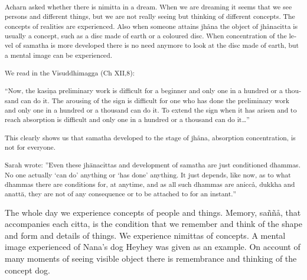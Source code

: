 \textsuperscript{\textdutch{Acharn asked whether there is nimitta in a
dream. When we are dreaming it seems that we see persons and different
things, but we are not really seeing but thinking of different concepts.
The concepts of realities are experienced. Also when someone attains
jhåna the object of jhånacitta is usually a concept, such as a disc made
of earth or a coloured disc. When concentration of the level of samatha
is more developed there is no need anymore to look at the disc made of
earth, but a mental image can be experienced. }}

\textsuperscript{\textdutch{We read in the Visuddhimagga (Ch XII,8):}}

\textsuperscript{``\textenglish[variant=american]{Now, the
kasi}{{ṇ}}\textenglish[variant=american]{a preliminary work is difficult
for a beginner and only one in a hundred or a thousand can do it. The
arousing of the sign is difficult for one who has done the preliminary
work and only one in a hundred or a thousand can do it. To extend the
sign when it has arisen and to reach absorption is difficult and only
one in a hundred or a thousand can do it}\textdutch{\ldots{}''}}

\textsuperscript{\textdutch{This clearly shows us that samatha developed
to the stage of jhåna, absorption concentration, is not for everyone. }}

\textsuperscript{\textdutch{Sarah wrote:
''E}\textenglish[variant=american]{ven these
jh}{{ā}}\textenglish[variant=american]{nacittas and development of
samatha are just conditioned dhammas. No one actually
}\textdutch{`}\textenglish[variant=american]{can
do}\textdutch{'}\textenglish[variant=american]{ anything or
}\textdutch{`}\textenglish[variant=american]{has
done}\textdutch{'}\textenglish[variant=american]{ anything. It just
depends, like now, as to what dhammas there are conditions
for}\textdutch{,}\textenglish[variant=american]{ at
anytime}\textdutch{,}\textenglish[variant=american]{ and as all such
dhammas are anicc}\textdutch{å}, dukkha and
anatt{{ā}}\textenglish[variant=american]{, they are not of any
consequence or to be attached to for an instant.}\textdutch{''}}

\textdutch{The whole day we experience concepts of people and things.
Memory, saññå, that accompanies each citta, is the condition that we
remember and think of the shape and form and details of things. We
experience nimittas of concepts. A mental image experienced of Nana's
dog Heyhey was given as an example. On account of many moments of seeing
visible object there is remembrance and thinking of the concept dog. }

